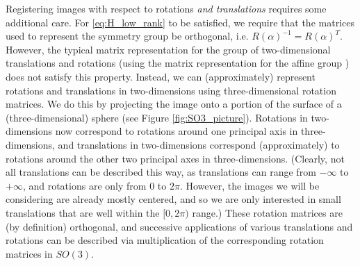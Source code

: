 \documentclass{pnastwo}
\begin{document}
\begin{article}
\begin{materials}
Registering images with respect to rotations {\em and translations} requires some additional care.
%
%
For \eqref{eq:H_low_rank} to be satisfied, we require that the matrices used to represent the symmetry group be orthogonal, i.e. $R(\alpha)^{-1} = R(\alpha)^T$. 
%
However, the typical matrix representation for the group of two-dimensional translations and rotations (using the matrix representation for the affine group \cite{...}) does not satisfy this property. 
%
Instead, we can (approximately) represent rotations and translations in two-dimensions using three-dimensional rotation matrices.
%
We do this by projecting the image onto a portion of the surface of a (three-dimensional) sphere (see Figure \ref{fig:SO3_picture}).
%
Rotations in two-dimensions now correspond to rotations around one principal axis in three-dimensions, and translations in two-dimensions correspond (approximately) to rotations around the other two principal axes in three-dimensions. (Clearly, not all translations can be described this way, as translations can range from $-\infty$ to $+ \infty$, and rotations are only from $0$ to $2 \pi$. However, the images we will be considering are already mostly centered, and so we are only interested in small translations that are well within the $[0, 2\pi)$ range.)
%
These rotation matrices are (by definition) orthogonal, and successive applications of various translations and rotations can be described via multiplication of the corresponding rotation matrices in $SO(3)$.


\end{materials}
\end{article}
\end{document}
